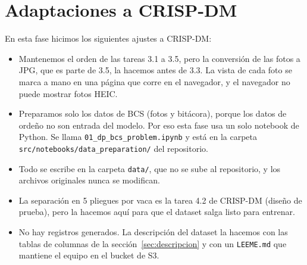 \section*{Adaptaciones a CRISP-DM}

En esta fase hicimos los siguientes ajustes a CRISP-DM:

\begin{itemize}
  \item Mantenemos el orden de las tareas 3.1 a 3.5, pero la conversión de las fotos a JPG, que es parte de 3.5, la hacemos antes de 3.3. La vista de cada foto se marca a mano en una página que corre en el navegador, y el navegador no puede mostrar fotos HEIC.
  \item Preparamos solo los datos de BCS (fotos y bitácora), porque los datos de ordeño no son entrada del modelo. Por eso esta fase usa un solo notebook de Python. Se llama \nolinkurl{01_dp_bcs_problem.ipynb} y está en la carpeta \nolinkurl{src/notebooks/data_preparation/} del repositorio.
  \item Todo se escribe en la carpeta \nolinkurl{data/}, que no se sube al repositorio, y los archivos originales nunca se modifican.
  \item La separación en 5 pliegues por vaca es la tarea 4.2 de CRISP-DM (diseño de prueba), pero la hacemos aquí para que el dataset salga listo para entrenar.
  \item No hay registros generados. La descripción del dataset la hacemos con las tablas de columnas de la sección~\ref{sec:descripcion} y con un \nolinkurl{LEEME.md} que mantiene el equipo en el bucket de S3.
\end{itemize}
